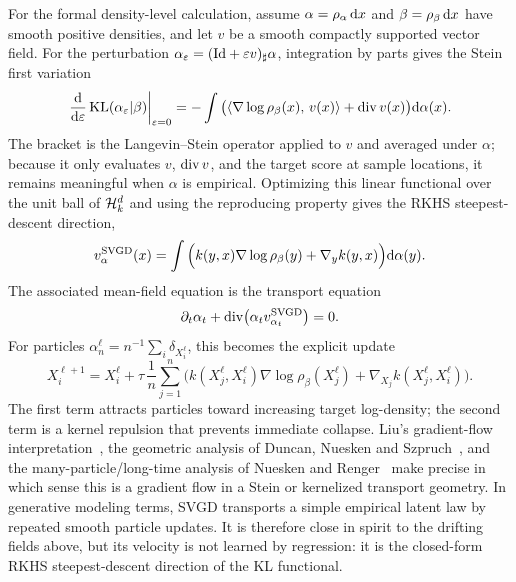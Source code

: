 For the formal density-level calculation, assume $\alpha=\rho_\alpha\,\mathrm{d} x$ and $\beta=\rho_\beta\,\mathrm{d} x$ have smooth positive densities, and let $v$ be a smooth compactly supported vector field. For the perturbation $\alpha_\varepsilon=(\mathrm{Id}+\varepsilon v)_\sharp\alpha$, integration by parts gives the Stein first variation
\[
	\left.\frac{\mathrm{d}}{\mathrm{d}\varepsilon}\operatorname{KL}(\alpha_\varepsilon|\beta)\right|_{\varepsilon=0}
	=
	-\int
	\big(\langle \nabla\log\rho_\beta(x),\,v(x)\rangle+\operatorname{div} v(x)\big)
	\mathrm{d}\alpha(x).
\]
The bracket is the Langevin--Stein operator applied to $v$ and averaged under $\alpha$; because it only evaluates $v$, $\operatorname{div} v$, and the target score at sample locations, it remains meaningful when $\alpha$ is empirical. Optimizing this linear functional over the unit ball of $\mathcal{H}_k^d$ and using the reproducing property gives the RKHS steepest-descent direction,
\begin{equation}\label{eq-svgd-velocity}
	v_{\alpha}^{\mathrm{SVGD}}(x)
	=
	\int
	\Big(k(y,x)\nabla\log\rho_\beta(y)+\nabla_y k(y,x)\Big)
	\mathrm{d}\alpha(y).
\end{equation}
The associated mean-field equation is the transport equation
\begin{equation}\label{eq-svgd-mean-field}
	\partial_t\alpha_t+\operatorname{div}\bigl(\alpha_t v_{\alpha_t}^{\mathrm{SVGD}}\bigr)=0.
\end{equation}
For particles $\alpha^\ell_n=n^{-1}\sum_i\delta_{X_i^\ell}$, this becomes the explicit update
\begin{equation}\label{eq-svgd-particle-update}
	X_i^{\ell+1}
	=
	X_i^\ell
	+
	\tau\,\frac{1}{n}\sum_{j=1}^n
	\Big(k(X_j^\ell,X_i^\ell)\nabla\log\rho_\beta(X_j^\ell)
	+
	\nabla_{X_j}k(X_j^\ell,X_i^\ell)\Big).
\end{equation}
The first term attracts particles toward increasing target log-density; the second term is a kernel repulsion that prevents immediate collapse. Liu's gradient-flow interpretation~\cite{Liu2017SVGDGradientFlow}, the geometric analysis of Duncan, Nuesken and Szpruch~\cite{DuncanNueskenSzpruch2019SVGDGeometry}, and the many-particle/long-time analysis of Nuesken and Renger~\cite{NueskenRenger2021SVGDAsymptotics} make precise in which sense this is a gradient flow in a Stein or kernelized transport geometry. In generative modeling terms, SVGD transports a simple empirical latent law by repeated smooth particle updates. It is therefore close in spirit to the drifting fields above, but its velocity is not learned by regression: it is the closed-form RKHS steepest-descent direction of the KL functional.

